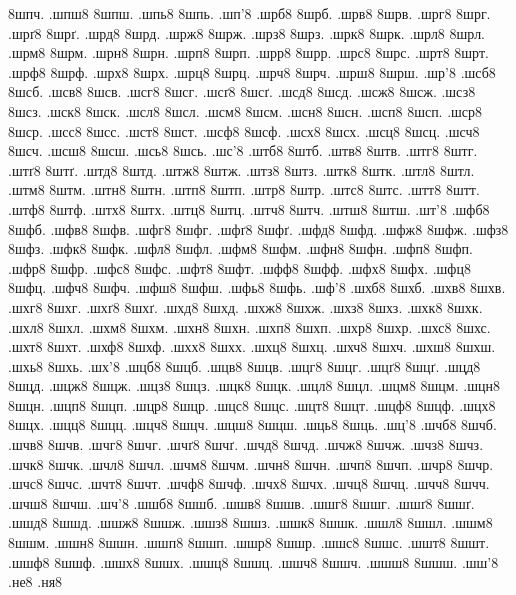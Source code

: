 {8шпч.
.шпш8
8шпш.
.шпь8
8шпь.
.шп'8
.шрб8
8шрб.
.шрв8
8шрв.
.шрг8
8шрг.
.шрґ8
8шрґ.
.шрд8
8шрд.
.шрж8
8шрж.
.шрз8
8шрз.
.шрк8
8шрк.
.шрл8
8шрл.
.шрм8
8шрм.
.шрн8
8шрн.
.шрп8
8шрп.
.шрр8
8шрр.
.шрс8
8шрс.
.шрт8
8шрт.
.шрф8
8шрф.
.шрх8
8шрх.
.шрц8
8шрц.
.шрч8
8шрч.
.шрш8
8шрш.
.шр'8
.шсб8
8шсб.
.шсв8
8шсв.
.шсг8
8шсг.
.шсґ8
8шсґ.
.шсд8
8шсд.
.шсж8
8шсж.
.шсз8
8шсз.
.шск8
8шск.
.шсл8
8шсл.
.шсм8
8шсм.
.шсн8
8шсн.
.шсп8
8шсп.
.шср8
8шср.
.шсс8
8шсс.
.шст8
8шст.
.шсф8
8шсф.
.шсх8
8шсх.
.шсц8
8шсц.
.шсч8
8шсч.
.шсш8
8шсш.
.шсь8
8шсь.
.шс'8
.штб8
8штб.
.штв8
8штв.
.штг8
8штг.
.штґ8
8штґ.
.штд8
8штд.
.штж8
8штж.
.штз8
8штз.
.штк8
8штк.
.штл8
8штл.
.штм8
8штм.
.штн8
8штн.
.штп8
8штп.
.штр8
8штр.
.штс8
8штс.
.штт8
8штт.
.штф8
8штф.
.штх8
8штх.
.штц8
8штц.
.штч8
8штч.
.штш8
8штш.
.шт'8
.шфб8
8шфб.
.шфв8
8шфв.
.шфг8
8шфг.
.шфґ8
8шфґ.
.шфд8
8шфд.
.шфж8
8шфж.
.шфз8
8шфз.
.шфк8
8шфк.
.шфл8
8шфл.
.шфм8
8шфм.
.шфн8
8шфн.
.шфп8
8шфп.
.шфр8
8шфр.
.шфс8
8шфс.
.шфт8
8шфт.
.шфф8
8шфф.
.шфх8
8шфх.
.шфц8
8шфц.
.шфч8
8шфч.
.шфш8
8шфш.
.шфь8
8шфь.
.шф'8
.шхб8
8шхб.
.шхв8
8шхв.
.шхг8
8шхг.
.шхґ8
8шхґ.
.шхд8
8шхд.
.шхж8
8шхж.
.шхз8
8шхз.
.шхк8
8шхк.
.шхл8
8шхл.
.шхм8
8шхм.
.шхн8
8шхн.
.шхп8
8шхп.
.шхр8
8шхр.
.шхс8
8шхс.
.шхт8
8шхт.
.шхф8
8шхф.
.шхх8
8шхх.
.шхц8
8шхц.
.шхч8
8шхч.
.шхш8
8шхш.
.шхь8
8шхь.
.шх'8
.шцб8
8шцб.
.шцв8
8шцв.
.шцг8
8шцг.
.шцґ8
8шцґ.
.шцд8
8шцд.
.шцж8
8шцж.
.шцз8
8шцз.
.шцк8
8шцк.
.шцл8
8шцл.
.шцм8
8шцм.
.шцн8
8шцн.
.шцп8
8шцп.
.шцр8
8шцр.
.шцс8
8шцс.
.шцт8
8шцт.
.шцф8
8шцф.
.шцх8
8шцх.
.шцц8
8шцц.
.шцч8
8шцч.
.шцш8
8шцш.
.шць8
8шць.
.шц'8
.шчб8
8шчб.
.шчв8
8шчв.
.шчг8
8шчг.
.шчґ8
8шчґ.
.шчд8
8шчд.
.шчж8
8шчж.
.шчз8
8шчз.
.шчк8
8шчк.
.шчл8
8шчл.
.шчм8
8шчм.
.шчн8
8шчн.
.шчп8
8шчп.
.шчр8
8шчр.
.шчс8
8шчс.
.шчт8
8шчт.
.шчф8
8шчф.
.шчх8
8шчх.
.шчц8
8шчц.
.шчч8
8шчч.
.шчш8
8шчш.
.шч'8
.шшб8
8шшб.
.шшв8
8шшв.
.шшг8
8шшг.
.шшґ8
8шшґ.
.шшд8
8шшд.
.шшж8
8шшж.
.шшз8
8шшз.
.шшк8
8шшк.
.шшл8
8шшл.
.шшм8
8шшм.
.шшн8
8шшн.
.шшп8
8шшп.
.шшр8
8шшр.
.шшс8
8шшс.
.шшт8
8шшт.
.шшф8
8шшф.
.шшх8
8шшх.
.шшц8
8шшц.
.шшч8
8шшч.
.шшш8
8шшш.
.шш'8
%
%
%
.не8
.ня8
%
}
